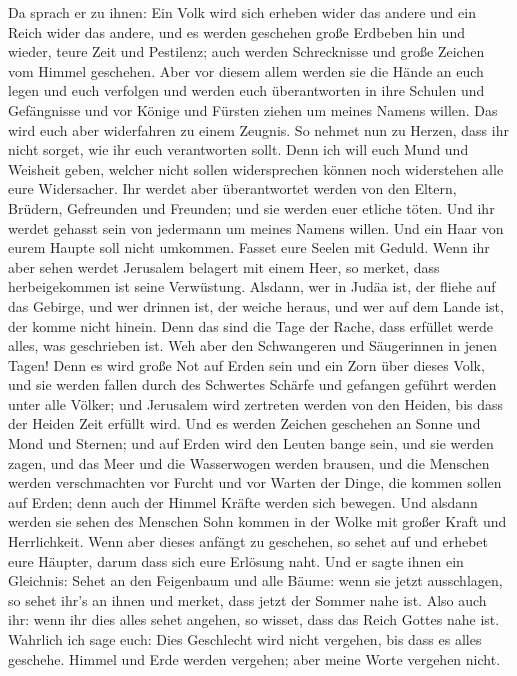  Da sprach er zu ihnen: Ein Volk wird sich erheben wider
das andere und ein Reich wider das andere,  und es werden
geschehen große Erdbeben hin und wieder, teure Zeit und Pestilenz; auch
werden Schrecknisse und große Zeichen vom Himmel geschehen.
 Aber vor diesem allem werden sie die Hände an euch legen
und euch verfolgen und werden euch überantworten in ihre Schulen und
Gefängnisse und vor Könige und Fürsten ziehen um meines Namens willen.
 Das wird euch aber widerfahren zu einem Zeugnis.
 So nehmet nun zu Herzen, dass ihr nicht sorget, wie ihr
euch verantworten sollt.  Denn ich will euch Mund und
Weisheit geben, welcher nicht sollen widersprechen können noch
widerstehen alle eure Widersacher.  Ihr werdet aber
überantwortet werden von den Eltern, Brüdern, Gefreunden und Freunden;
und sie werden euer etliche töten.  Und ihr werdet
gehasst sein von jedermann um meines Namens willen.  Und
ein Haar von eurem Haupte soll nicht umkommen.  Fasset
eure Seelen mit Geduld.  Wenn ihr aber sehen werdet
Jerusalem belagert mit einem Heer, so merket, dass herbeigekommen ist
seine Verwüstung.  Alsdann, wer in Judäa ist, der fliehe
auf das Gebirge, und wer drinnen ist, der weiche heraus, und wer auf dem
Lande ist, der komme nicht hinein.  Denn das sind die
Tage der Rache, dass erfüllet werde alles, was geschrieben ist.
 Weh aber den Schwangeren und Säugerinnen in jenen Tagen!
Denn es wird große Not auf Erden sein und ein Zorn über dieses Volk,
 und sie werden fallen durch des Schwertes Schärfe und
gefangen geführt werden unter alle Völker; und Jerusalem wird zertreten
werden von den Heiden, bis dass der Heiden Zeit erfüllt wird.
 Und es werden Zeichen geschehen an Sonne und Mond und
Sternen; und auf Erden wird den Leuten bange sein, und sie werden zagen,
und das Meer und die Wasserwogen werden brausen,  und die
Menschen werden verschmachten vor Furcht und vor Warten der Dinge, die
kommen sollen auf Erden; denn auch der Himmel Kräfte werden sich
bewegen.  Und alsdann werden sie sehen des Menschen Sohn
kommen in der Wolke mit großer Kraft und Herrlichkeit. 
Wenn aber dieses anfängt zu geschehen, so sehet auf und erhebet eure
Häupter, darum dass sich eure Erlösung naht.  Und er
sagte ihnen ein Gleichnis: Sehet an den Feigenbaum und alle Bäume:
 wenn sie jetzt ausschlagen, so sehet ihr's an ihnen und
merket, dass jetzt der Sommer nahe ist.  Also auch ihr:
wenn ihr dies alles sehet angehen, so wisset, dass das Reich Gottes nahe
ist.  Wahrlich ich sage euch: Dies Geschlecht wird nicht
vergehen, bis dass es alles geschehe.  Himmel und Erde
werden vergehen; aber meine Worte vergehen nicht.

